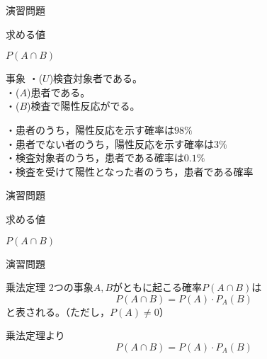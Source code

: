 \documentclass[aspectratio=169, dvipdfmx, 11pt]{beamer}
\begin{document}
\begin{frame}{演習問題}

\begin{alertblock}{求める値}
\begin{center}
$P(A\cap B)$
\end{center}
\end{alertblock}

\begin{alertblock}{事象}
・($U$)検査対象者である。\\
・($A$)患者である。\\
・($B$)検査で陽性反応がでる。\\
\end{alertblock}

・患者のうち，陽性反応を示す確率は$98\%$\\
・患者でない者のうち，陽性反応を示す確率は$3\%$\\
・検査対象者のうち，患者である確率は$0.1\%$\\
・検査を受けて陽性となった者のうち，患者である確率

\end{frame}


\begin{frame}{演習問題}

\begin{alertblock}{求める値}
\begin{center}
$P(A\cap B)$
\end{center}
\end{alertblock}

\end{frame}


\begin{frame}{演習問題}

    \begin{block}{乗法定理}
	$2$つの事象$A,B$がともに起こる確率$P(A\cap B)$は
	\begin{equation}
		P(A\cap B)=P(A)\cdot P_A(B)
	\end{equation}
	と表される。（ただし，$P(A)\ne 0$）
    \end{block}

乗法定理より
\begin{equation}
P(A\cap B)=P(A)\cdot P_A(B)
\end{equation}

\end{frame}
\end{document}
